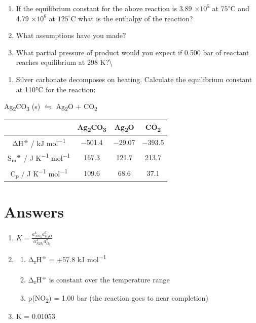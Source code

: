\documentclass[
]{book}
\providecommand{\tightlist}{%
  \setlength{\itemsep}{0pt}\setlength{\parskip}{0pt}}
\begin{document}
\begin{enumerate}
\def\labelenumi{\alph{enumi}.}
\item
  If the equilibrium constant for the above reaction is 3.89 \(\times 10^5\) at \(75 ^{\circ}\)C and 4.79 \(\times 10^6\) at \(125 ^{\circ}\)C what is the enthalpy of the reaction?
\item
  What assumptions have you made?
\item
  What partial pressure of product would you expect if 0.500 bar of reactant reaches equilibrium at 298 K?\textbackslash{}
\end{enumerate}

\begin{enumerate}
\def\labelenumi{\arabic{enumi}.}
\setcounter{enumi}{2}
\tightlist
\item
  Silver carbonate decomposes on heating. Calculate the equilibrium constant at 110°C for the reaction:
\end{enumerate}

Ag\textsubscript{2}CO\textsubscript{3} (s) \(\leftrightharpoons\) Ag\textsubscript{2}O + CO\textsubscript{2}

\begin{longtable}[]{@{}cccc@{}}
\toprule
& Ag\textsubscript{2}CO\textsubscript{3} & Ag\textsubscript{2}O & CO\textsubscript{2}\tabularnewline
\midrule
\endhead
ΔH\textsuperscript{⦵} / kJ mol\textsuperscript{−1} & −501.4 & −29.07 & −393.5\tabularnewline
S\textsubscript{m}\textsuperscript{⦵} / J K\textsuperscript{−1} mol\textsuperscript{−1} & 167.3 & 121.7 & 213.7\tabularnewline
C\textsubscript{p} / J K\textsuperscript{−1} mol\textsuperscript{−1} & 109.6 & 68.6 & 37.1\tabularnewline
\bottomrule
\end{longtable}

\hypertarget{sec:w4p2answer}{%
\section{Answers}\label{sec:w4p2answer}}

\begin{enumerate}
\def\labelenumi{\arabic{enumi}.}
\item
  \(K = \frac{a_{NO_2}^4 a_{H_2O}^6}{a_{NH_3}^4 a_{O_2}^7}\)
\item
  \begin{enumerate}
  \def\labelenumii{\alph{enumii}.}
  \tightlist
  \item
    Δ\textsubscript{r}H\textsuperscript{⦵} = +57.8 kJ mol\textsuperscript{−1}
  \item
    Δ\textsubscript{r}H\textsuperscript{⦵} is constant over the temperature range
  \item
    p(NO\textsubscript{2}) = 1.00 bar (the reaction goes to near completion)
  \end{enumerate}
\item
  K = 0.01053
\end{enumerate}
\end{document}
